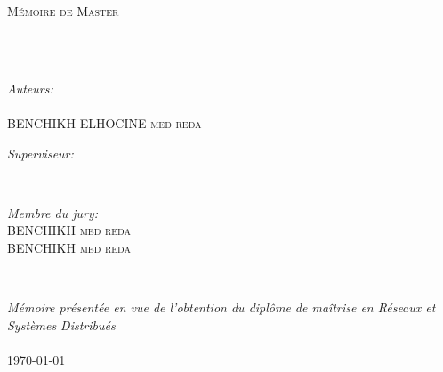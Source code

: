 \documentclass[
12pt, %
french, %
singlespacing, %
headsepline, %
consistentlayout, %
openany
]{MastersDoctoralThesis} %
\author{DRIA \textsc{salim}} %
\begin{document}
\pagestyle{plain} %


\begin{titlepage}
\begin{center}

\vspace*{.06\textheight}
{\scshape\LARGE \univname\par}\vspace{1.5cm} %
\textsc{\Large Mémoire de Master}\\[0.5cm] %

\HRule \\[0.4cm] %
{\huge \bfseries \ttitle\par}\vspace{0.4cm} %
\HRule \\[1.5cm] %
 
\begin{minipage}[t]{0.45\textwidth}
\begin{flushleft} \large
\emph{Auteurs:}\\
{\authorname}
\\
{BENCHIKH ELHOCINE \textsc{med reda}}
\end{flushleft}
\end{minipage}
\begin{minipage}[t]{0.45\textwidth}
\begin{flushright} \large
\emph{Superviseur:} \\
{\supname} %
\end{flushright}
\end{minipage}\\[1.5cm]
 
\begin{minipage}[t]{0.5\textwidth}
\begin{flushleft} \large
\emph{Membre du jury:}\\
{BENCHIKH \textsc{med reda}}
\\
{BENCHIKH \textsc{med reda}}
\end{flushleft}
\end{minipage}\\[3cm]

\vfill

\large \textit{Mémoire présentée en vue de l'obtention du diplôme de maîtrise en Réseaux et Systèmes Distribués}\\[0.3cm] %
\textit{}\\

{\large \today}\\[4cm] %
 
\vfill
\end{center}
\end{titlepage}
\end{document}
